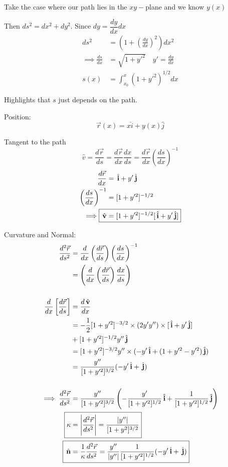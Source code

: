 \documentclass[10pt]{scrartcl}
\begin{document}
Take the case where our path lies in the $xy-$plane and we know $y(x)$
\begin{center}
\end{center}

Then $ds^2 = dx^2 + dy^2$. Since $dy = \dfrac{dy}{dx}dx$ 
\[\begin{aligned}
ds^2 &= \left(1 + \left(\frac{dy}{dx}\right)^2\right)dx^2\\
\implies \frac{ds}{dx} &= \sqrt{1 + y'^2}\quad y' = \frac{dy}{dx}\\
s(x) &= \int_{x_0}^x (1 + y'^2)^{1/2}dx
\end{aligned}\]

Highlights that $s$ just depends on the path. 


Position: \[\vec{r}(x) = x\hat{i} + y(x)\hat{j}\]

Tangent to the path
\[\hat{v} = \frac{d\vec{r}}{ds} = \frac{d\vec{r}}{dx}\frac{dx}{ds} = \frac{d\vec{r}}{dx}\left(\frac{ds}{dx}\right)^{-1}\]
\[\begin{aligned}
\frac{d\vec{r}}{dx} &= \hat{i} + y'\hat{j}\\
\left(\frac{ds}{dx}\right)^{-1} &= [1 + y'^2]^{-1/2}\\
\implies \Aboxed{\hat{v} &= [1+y'^2]^{-1/2}[\hat{i} + y'\hat{j}]}
\end{aligned}\]

Curvature and Normal:
\[\begin{aligned}
\frac{d^2\vec{r}}{ds^2} &= \frac{d}{dx}\left(\frac{d\vec{r}}{ds}\right)\left(\frac{ds}{dx}\right)^{-1}\\
&= \left(\frac{d}{dx}\left(\frac{d\vec{r}}{ds}\right)\frac{dx}{ds}\right)\\[0.5cm]
\frac{d}{dx}\left[\frac{d\vec{r}}{ds}\right] &= \frac{d\hat{v}}{dx}\\
 &= -\frac{1}{2}[1+y'^2]^{-3/2} \times (2y'y'')\times [\hat{i} + y'\hat{j}]\\
 &+ [1 + y'^2]^{-1/2}y''\hat{j}\\
 &= [1 + y'^2]^{-3/2}y'' \times (-y'\hat{i} + (1+y'^2 - y'^2)\hat{j})\\
 &= \frac{y''}{[1+y'^2]^{3/2}}(-y'\hat{i} + \hat{j})\\[0.5cm]
 \implies \frac{d^2\vec{r}}{ds^2} &= \frac{y''}{[1+y'^2]^{3/2}}\left(-\frac{y'}{[1+y'^2]^{1/2}}\hat{i} + \frac{1}{[1+y'^2]^{1/2}}\hat{j}\right)\\
 \Aboxed{\kappa &= \left|\frac{d^2\vec{r}}{ds^2}\right| = \frac{|y''|}{[1+y^2]^{3/2}}}\\
  \Aboxed{\hat{n} &= \frac{1}{\kappa} \frac{d^2\vec{r}}{ds^2} = \frac{y''}{|y''|}\frac{1}{[1+y'^2]^{1/2}}(-y'\hat{i} + \hat{j})}
\end{aligned}
\]~
\end{document}
